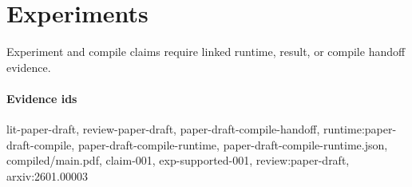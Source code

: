 \section{Experiments}
Experiment and compile claims require linked runtime, result, or compile handoff evidence.

\paragraph{Evidence ids} lit-paper-draft, review-paper-draft, paper-draft-compile-handoff, runtime:paper-draft-compile, paper-draft-compile-runtime, paper-draft-compile-runtime.json, compiled/main.pdf, claim-001, exp-supported-001, review:paper-draft, arxiv:2601.00003

